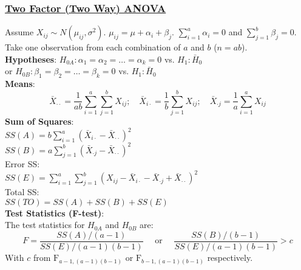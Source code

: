 \documentclass{article}
\begin{document}
\begin{multicols*}{2}
\subsubsection*{\underline{Two Factor (Two Way) ANOVA}}
Assume $X_{ij} \sim N(\mu_{ij}, \sigma^{2})$. $\mu_{ij} = \mu + \alpha_{i} + \beta_{j}$. $\sum_{i=1}^{a} \alpha_{i} = 0$ and $\sum_{j=1}^{b} \beta_{j} = 0$. Take one observation from each combination of $a$ and $b$ ($n = ab$).\\
\textbf{Hypotheses}: $H_{0A}: \alpha_{1} = \alpha_{2} = \dots = \alpha_{k} = 0$ vs. $H_{1}: \bar{H}_{0}$\\
or $H_{0B}: \beta_{1} = \beta_{2} = \dots = \beta_{k} = 0$ vs. $H_{1}: \bar{H}_{0}$\\
\textbf{Means}:
$$\bar{X}_{\cdot \cdot} = \frac{1}{ab} \sum_{i=1}^{a} \sum_{j=1}^{b} X_{ij}; \quad \bar{X}_{i \cdot} = \frac{1}{b} \sum_{j=1}^{b} X_{ij}; \quad \bar{X}_{\cdot j} = \frac{1}{a} \sum_{i=1}^{a} X_{ij}$$
\textbf{Sum of Squares}:\\
$SS(A) = b \sum_{i=1}^{a} (\bar{X}_{i\cdot} - \bar{X}_{\cdot \cdot})^{2}$\\
$SS(B) = a \sum_{j=1}^{b} (\bar{X}_{\cdot j} - \bar{X}_{\cdot \cdot})^{2}$\\
Error SS:\\
$SS(E) = \sum_{i=1}^{a} \sum_{j=1}^{b} (X_{ij} - \bar{X}_{i\cdot} - \bar{X}_{\cdot j} + \bar{X}_{\cdot \cdot})^{2}$\\
Total SS:\\
$SS(TO) = SS(A) + SS(B) + SS(E)$\\
\textbf{Test Statistics (F-test)}:\\
The test statistics for $H_{0A}$ and $H_{0B}$ are:
$$F = \frac{SS(A) / (a-1)}{SS(E) / (a-1)(b-1)} \quad \mbox{ or } \quad \frac{SS(B) / (b-1)}{SS(E) / (a-1)(b-1)} > c$$
With $c$ from $\mbox{F}_{a-1, (a-1)(b-1)}$ or $\mbox{F}_{b-1, (a-1)(b-1)}$ respectively.


\end{multicols*}
\end{document}
